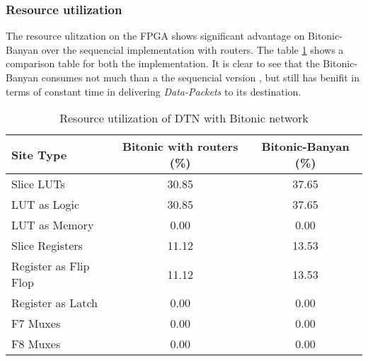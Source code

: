 				 \subsubsection{Resource utilization}
					      The resource ulitzation on the FPGA shows significant advantage on Bitonic-Banyan over the sequencial implementation with routers. The table \ref{fig:bitonic_utilisation}
					      shows a comparison table for both the implementation. It is clear to see that the Bitonic-Banyan consumes not much than a the sequencial version , but still has benifit in
					      terms of constant time in delivering \textit{Data-Packets} to its destination.
					    \begin{table}
					    \begin{center}
					      \begin{tabular}{l | c | c }
						\textbf{Site Type}  & \textbf{Bitonic with routers (\%)} & \textbf{Bitonic-Banyan (\%)} \\
						\hline \hline
						Slice LUTs 			& 30.85 & 37.65 \\ 
						\quad LUT as Logic		& 30.85 & 37.65 \\
						\quad LUT as Memory		& 0.00 & 0.00 	\\
						Slice Registers 		& 11.12	& 13.53 \\
						\quad Register as Flip Flop	& 11.12	& 13.53	\\
						\quad Register as Latch	& 0.00	& 0.00	\\
						F7 Muxes			& 0.00	& 0.00	\\
						F8 Muxes 			& 0.00	& 0.00	\\
					      \end{tabular}
					      \end{center}
					      \caption{Resource utilization of DTN with Bitonic network}
					      \label{fig:bitonic_utilisation}
					    \end{table}


